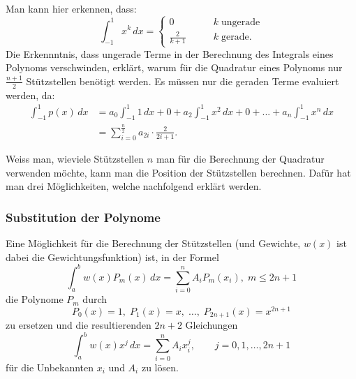 Man kann hier erkennen, dass:
\begin{equation}
    \int_{-1}^{1} x^{k}\,dx 
    =
    \begin{cases}
        0&\qquad k \; \text{ungerade}\\
        \frac{2}{k+1}&\qquad k \; \text{gerade}.
        \end{cases}  
\end{equation}
Die Erkennntnis, dass ungerade Terme in der Berechnung 
des Integrals eines Polynoms verschwinden, 
erklärt, warum für die Quadratur eines Polynoms nur $\frac{n+1}{2}$ 
Stützstellen benötigt werden. Es müssen nur die geraden Terme evaluiert werden,
da:
\begin{align}
    \int_{-1}^{1} p(x)\,dx 
    &=
    a_{0} \int_{-1}^{1} 1\,dx
    +
    0
    + 
    a_{2}\int_{-1}^{1} x^{2} \,dx  
    +
    0
    +
    ... 
    +
    a_{n}\int_{-1}^{1} x^{n}\,dx
    \\
    &= \sum_{i=0}^{\frac{n}{2}} a_{2i} \cdot \frac{2}{2i+1}.
\end{align}
    


Weiss man, wieviele Stützstellen $n$ man für die Berechnung der Quadratur verwenden möchte,
kann man die Position der Stützstellen berechnen. 
Dafür hat man drei Möglichkeiten, welche nachfolgend erklärt werden.

\subsubsection{Substitution der Polynome}
Eine Möglichkeit für die Berechnung der Stützstellen 
(und Gewichte, $w(x)$ ist dabei die Gewichtungsfunktion) ist, in der Formel
%
%
\begin{equation} \label{quadratur:equation:polynomsubstitution}
    \int_{a}^{b}w(x)P_{m}(x)\, dx = \sum_{i=0}^{n}A_{i}P_{m}(x_{i}), \; m \leq 2n + 1
\end{equation}
die Polynome $P_{m}$ durch
\begin{equation}
     P_{0}(x) = 1,\; P_{1}(x) = x,\; \dots ,\; P_{2n+1}(x) = x^{2n+1}
\end{equation}
zu ersetzen und die resultierenden $2n+2$ Gleichungen 
\begin{equation}
    \int_{a}^{b}w(x)x^{j}\,dx = \sum_{i=0}^{n} A_{i}x_{i}^{j},\qquad j = 0, 1, \dots , 2 n + 1
\end{equation}
für die Unbekannten $x_{i}$ und $A_{i}$ zu lösen.


